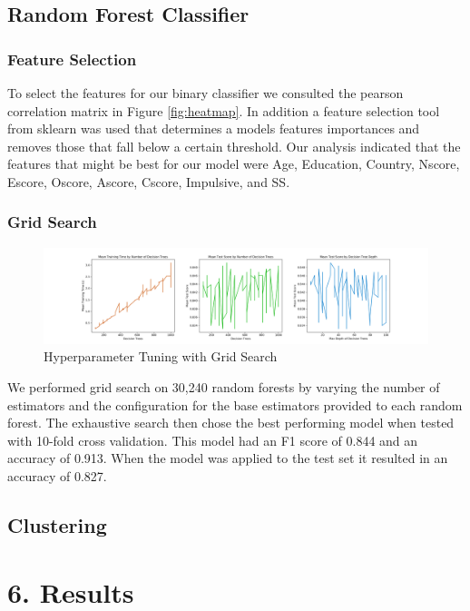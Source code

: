 \documentclass[10pt]{article}
\begin{document}
\subsection*{Random Forest Classifier}

\subsubsection*{Feature Selection}

To select the features for our binary classifier we consulted the pearson correlation matrix in Figure \ref{fig:heatmap}. In addition a feature selection tool from sklearn was used that determines a models features importances and removes those that fall below a certain threshold. Our analysis indicated that the features that might be best for our model were Age, Education, Country, Nscore, Escore, Oscore, Ascore, Cscore, Impulsive, and SS.

\subsubsection*{Grid Search}

\begin{figure}[H]
\caption{Hyperparameter Tuning with Grid Search }
\label{fig:gridsearch}
\centering
\includegraphics[scale=0.35]{gridsearch.png}
\end{figure}

We performed grid search on 30,240 random forests by varying the number of estimators and the configuration for the base estimators provided to each random forest. The exhaustive search then chose the best performing model when tested with 10-fold cross validation. This model had an F1 score of 0.844 and an accuracy of 0.913. When the model was applied to the test set it resulted in an accuracy of 0.827.

\subsection*{Clustering}

\section*{6. Results}
\end{document}
